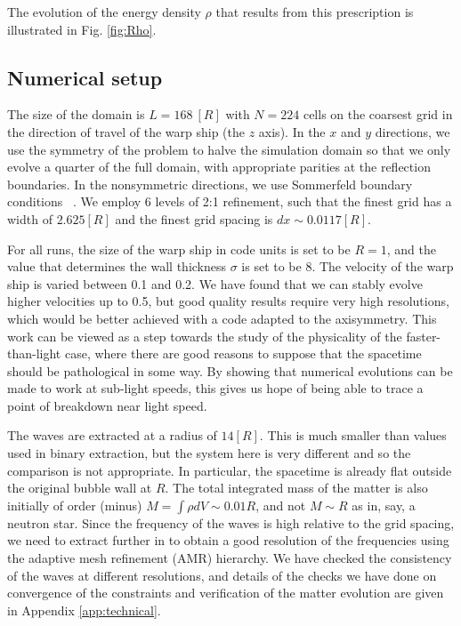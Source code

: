 \documentclass[twocolumn, numberedappendix, twocolappendix,apj, iop, a4paper]{openjournal}
\begin{document}
The evolution of the energy density $\rho$ that results from this prescription is illustrated in Fig. \ref{fig:Rho}.

\subsection{Numerical setup}

The size of the domain is $L=168~[R]$ with $N=224$ cells on the coarsest grid in the direction of travel of the warp ship (the $z$ axis). In the $x$ and $y$ directions, we use the symmetry of the problem to halve the simulation domain so that we only evolve a quarter of the full domain, with appropriate parities at the reflection boundaries. In the nonsymmetric directions, we use Sommerfeld boundary conditions ~\citep{Radia:2021smk}. We employ 6 levels of 2:1 refinement, such that the finest grid has a width of $2.625 [R]$ and the finest grid spacing is $dx\sim 0.0117 [R]$. 

For all runs, the size of the warp ship in code units is set to be $R=1$, and the value that determines the wall thickness $\sigma$ is set to be $8$. The velocity of the warp ship is varied between 0.1 and 0.2. We have found that we can stably evolve higher velocities up to 0.5, but good quality results require very high resolutions, which would be better achieved with a code adapted to the axisymmetry. This work can be viewed as a step towards the study of the physicality of the faster-than-light case, where there are good reasons to suppose that the spacetime should be pathological in some way. By showing that numerical evolutions can be made to work at sub-light speeds, this gives us hope of being able to trace a point of breakdown near light speed.

The waves are extracted at a radius of $14[R]$. This is much smaller than values used in binary extraction, but the system here is very different and so the comparison is not appropriate. In particular, the spacetime is already flat outside the original bubble wall at $R$. The total integrated mass of the matter is also initially of order (minus) $M = \int \rho dV \sim 0.01R$, and not $M\sim R$ as in, say, a neutron star. Since the frequency of the waves is high relative to the grid spacing, we need to extract further in to obtain a good resolution of the frequencies using the adaptive mesh refinement (AMR) hierarchy. We have checked the consistency of the waves at different resolutions, and details of the checks we have done on convergence of the constraints and verification of the matter evolution are given in Appendix \ref{app:technical}.
\end{document}
